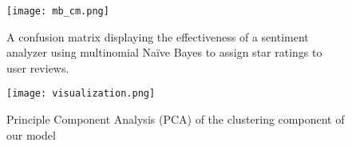 \begin{figure}[h]
	\centering
	\texttt{[image: mb\_cm.png]}
	\caption{A confusion matrix displaying the effectiveness of a sentiment analyzer using multinomial Na\"ive Bayes to assign star ratings to user reviews.}
	\label{fig:cm}
\end{figure}

\begin{figure}[h]
	\centering
	\texttt{[image: visualization.png]}
	\caption{Principle Component Analysis (PCA) of the clustering component of our model}
	\label{fig:pca}
\end{figure}